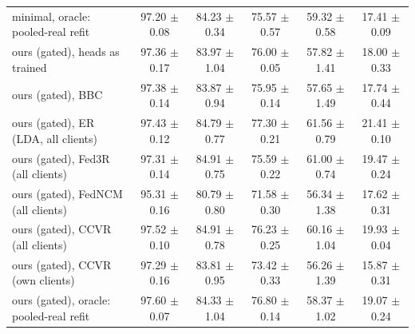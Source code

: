 \begin{tabular}{lccccc}
minimal, oracle: pooled-real refit & 97.20 $\pm$ 0.08 & 84.23 $\pm$ 0.34 & 75.57 $\pm$ 0.57 & 59.32 $\pm$ 0.58 & 17.41 $\pm$ 0.09 \\
ours (gated), heads as trained & 97.36 $\pm$ 0.17 & 83.97 $\pm$ 1.04 & 76.00 $\pm$ 0.05 & 57.82 $\pm$ 1.41 & 18.00 $\pm$ 0.33 \\
ours (gated), BBC & 97.38 $\pm$ 0.14 & 83.87 $\pm$ 0.94 & 75.95 $\pm$ 0.14 & 57.65 $\pm$ 1.49 & 17.74 $\pm$ 0.44 \\
ours (gated), ER (LDA, all clients) & 97.43 $\pm$ 0.12 & 84.79 $\pm$ 0.77 & 77.30 $\pm$ 0.21 & 61.56 $\pm$ 0.79 & 21.41 $\pm$ 0.10 \\
ours (gated), Fed3R (all clients) & 97.31 $\pm$ 0.14 & 84.91 $\pm$ 0.75 & 75.59 $\pm$ 0.22 & 61.00 $\pm$ 0.74 & 19.47 $\pm$ 0.24 \\
ours (gated), FedNCM (all clients) & 95.31 $\pm$ 0.16 & 80.79 $\pm$ 0.80 & 71.58 $\pm$ 0.30 & 56.34 $\pm$ 1.38 & 17.62 $\pm$ 0.31 \\
ours (gated), CCVR (all clients) & 97.52 $\pm$ 0.10 & 84.91 $\pm$ 0.78 & 76.23 $\pm$ 0.25 & 60.16 $\pm$ 1.04 & 19.93 $\pm$ 0.04 \\
ours (gated), CCVR (own clients) & 97.29 $\pm$ 0.16 & 83.81 $\pm$ 0.95 & 73.42 $\pm$ 0.33 & 56.26 $\pm$ 1.39 & 15.87 $\pm$ 0.31 \\
ours (gated), oracle: pooled-real refit & 97.60 $\pm$ 0.07 & 84.33 $\pm$ 1.04 & 76.80 $\pm$ 0.14 & 58.37 $\pm$ 1.02 & 19.07 $\pm$ 0.24 \\
\bottomrule
\end{tabular}
